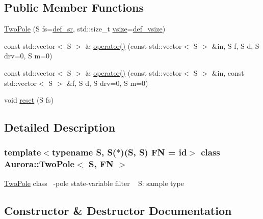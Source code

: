 \subsection*{Public Member Functions}
\begin{DoxyCompactItemize}
\item 
\hyperlink{class_aurora_1_1_two_pole_a4696c27f4c9f477c6e0336f65bb7e17a}{Two\+Pole} (S fs=\hyperlink{namespace_aurora_ad49263d809bea98dd422e95bc91bc03e}{def\+\_\+sr}, std\+::size\+\_\+t \hyperlink{class_aurora_1_1_snd_base_af9e21aaf411b17f7a8221c991ce5d291}{vsize}=\hyperlink{namespace_aurora_afaaddf667a06e7ce23c667a8b7295263}{def\+\_\+vsize})
\item 
const std\+::vector$<$ S $>$ \& \hyperlink{class_aurora_1_1_two_pole_a1dc2162d26dbb9215d2c31eaee2cea2f}{operator()} (const std\+::vector$<$ S $>$ \&in, S f, S d, S drv=0, S m=0)
\item 
const std\+::vector$<$ S $>$ \& \hyperlink{class_aurora_1_1_two_pole_a4cbd5c7edf3dadf6ab55a58fe3c50750}{operator()} (const std\+::vector$<$ S $>$ \&in, const std\+::vector$<$ S $>$ \&f, S d, S drv=0, S m=0)
\item 
void \hyperlink{class_aurora_1_1_two_pole_aef4afc0b8012d9bccf104488c6ebad3f}{reset} (S fs)
\end{DoxyCompactItemize}


\subsection{Detailed Description}
\subsubsection*{template$<$typename S, S($\ast$)(\+S, S) FN = id$>$\newline
class Aurora\+::\+Two\+Pole$<$ S, F\+N $>$}

\hyperlink{class_aurora_1_1_two_pole}{Two\+Pole} class ~-\/pole state-\/variable filter ~\newline
S\+: sample type 

\subsection{Constructor \& Destructor Documentation}
\mbox{\label{class_aurora_1_1_two_pole_a4696c27f4c9f477c6e0336f65bb7e17a}} 
